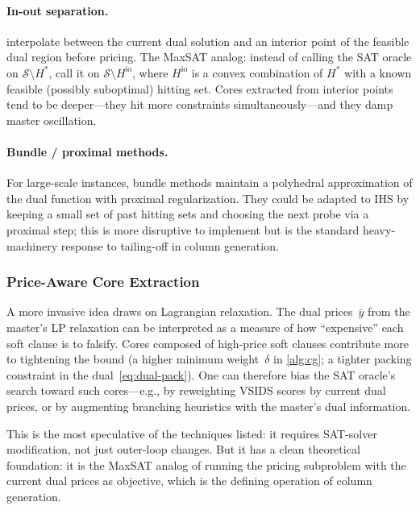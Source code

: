 \paragraph{In-out separation.}
\citet{benameur2007stabilization} interpolate between the current dual
solution and an interior point of the feasible dual region before pricing.
The MaxSAT analog: instead of calling the SAT oracle on $\mathcal{S}
\setminus H^*$, call it on $\mathcal{S} \setminus H^{\mathrm{io}}$, where
$H^{\mathrm{io}}$ is a convex combination of $H^*$ with a known feasible
(possibly suboptimal) hitting set. Cores extracted from interior points
tend to be deeper---they hit more constraints simultaneously---and they
damp master oscillation.

\paragraph{Bundle / proximal methods.}
For large-scale instances, bundle methods maintain a polyhedral approximation
of the dual function with proximal regularization. They could be adapted to
IHS by keeping a small set of past hitting sets and choosing the next probe
via a proximal step; this is more disruptive to implement but is the standard
heavy-machinery response to tailing-off in column generation.

\subsubsection{Price-Aware Core Extraction}

A more invasive idea draws on Lagrangian relaxation. The dual prices~$\bar{y}$
from the master's LP relaxation can be interpreted as a measure of how
``expensive'' each soft clause is to falsify. Cores composed of high-price
soft clauses contribute more to tightening the bound (a higher minimum
weight~$\delta$ in \cref{alg:cg}; a tighter packing constraint in
the dual~\eqref{eq:dual-pack}). One can therefore bias the SAT oracle's
search toward such cores---e.g., by reweighting VSIDS scores by current dual
prices, or by augmenting branching heuristics with the master's dual
information.

This is the most speculative of the techniques listed: it requires
SAT-solver modification, not just outer-loop changes. But it has a clean
theoretical foundation: it is the MaxSAT analog of running the pricing
subproblem with the current dual prices as objective, which is the defining
operation of column generation.

